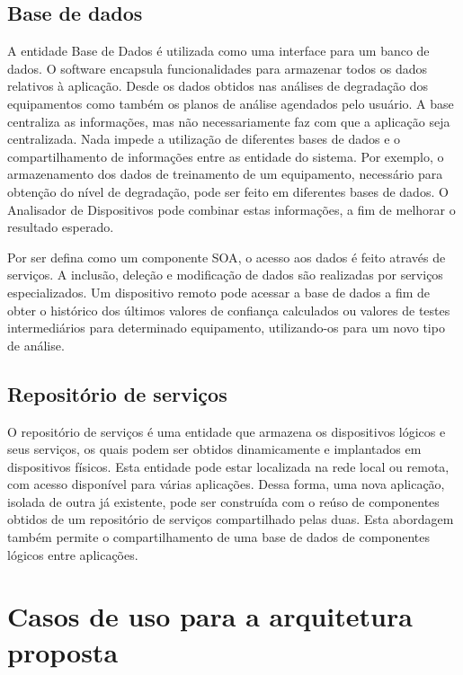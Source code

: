 \subsection{Base de dados}

A entidade Base de Dados é utilizada como uma interface para um banco de dados. O software encapsula
funcionalidades para  armazenar todos os dados relativos à aplicação. Desde os dados obtidos nas
análises de degradação dos equipamentos como também os planos de análise agendados pelo usuário. A
base centraliza as informações, mas não necessariamente faz com que a aplicação seja centralizada.
Nada impede a utilização de diferentes bases de dados e o
compartilhamento de informações entre as entidade do sistema. Por exemplo, o armazenamento dos dados
de treinamento de um equipamento, necessário para obtenção do nível de degradação, pode ser feito em
diferentes bases de dados. O Analisador de Dispositivos pode combinar estas informações, a fim de
melhorar o resultado esperado.

Por ser defina como um componente \gls{SOA}, o acesso aos dados é feito através de serviços. A
inclusão, deleção e modificação de dados são realizadas por serviços especializados. Um dispositivo
remoto pode acessar a base de dados a fim de obter o histórico dos últimos valores de confiança
calculados ou valores de testes intermediários para determinado equipamento, utilizando-os para um
novo tipo de análise.


\subsection{Repositório de serviços}

O repositório de serviços é uma entidade que armazena os dispositivos lógicos e seus serviços, os
quais podem ser obtidos dinamicamente e implantados em dispositivos físicos. Esta entidade pode
estar localizada na rede local ou remota, com acesso disponível para várias aplicações. Dessa forma,
uma nova aplicação, isolada de outra já existente, pode ser construída com o reúso de componentes
obtidos de um repositório de serviços compartilhado pelas duas. Esta abordagem também permite o
compartilhamento de uma base de dados de componentes lógicos entre aplicações.


\section{Casos de uso para a arquitetura proposta}

